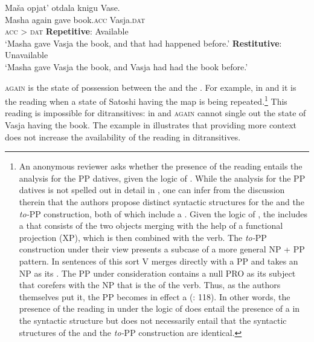 \documentclass[output=paper]{langscibook}
\begin{document}
 \ea\label{ex:bondarenko:6}
\gll Maša opjat’ otdala knigu Vase.\\
     Masha again gave book.\textsc{acc} Vasja.\textsc{dat}\\\hfill\textsc{acc} > \textsc{dat}
\ea \textbf{Repetitive}: Available\\`Masha gave Vasja the book, and that had happened before.'
\ex \textbf{Restitutive}: Unavailable\\`Masha gave Vasja the book, and Vasja had had the book   before.'
\z
\z

\largerpage[-3]
 \textsc{again}{ is the state of possession between the  and the . For example, in  and  it is the reading when a state of Satoshi having the map is being repeated.}\footnote{An anonymous reviewer asks whether the presence of the  reading entails the  analysis for the PP datives, given the logic of \citet{Beck-Johnson2004}. While the analysis for the PP datives is not spelled out in detail in \citet{Beck-Johnson2004}, one can infer from the discussion therein that the authors propose distinct syntactic structures for the  and the \textit{to-}PP construction, both of which include a . Given the logic of \citet{Beck-Johnson2004}, the  includes a  that consists of the two objects merging with the help of a functional projection (XP), which is then combined with the verb. The \textit{to-}PP construction under their view presents a subcase of a more general NP + PP pattern. In sentences of this sort V merges directly with a PP and takes an NP as its . The PP under consideration contains a null PRO as its subject that corefers with the NP that is the  of the verb. Thus, as the authors themselves put it, the PP becomes in effect a  (\citealt{Beck-Johnson2004}: 118). In other words, the presence of the  reading in  under the logic of \citet{Beck-Johnson2004} does entail the presence of a  in the syntactic structure but does not necessarily entail that the syntactic structures of the  and the \textit{to-}PP construction are identical.}{ This reading is impossible for  ditransitives: in  and } \textsc{again}{ cannot single out the state of Vasja having the book. The example in  illustrates that providing more context does not increase the availability of the  reading in  ditransitives.}
\end{document}
